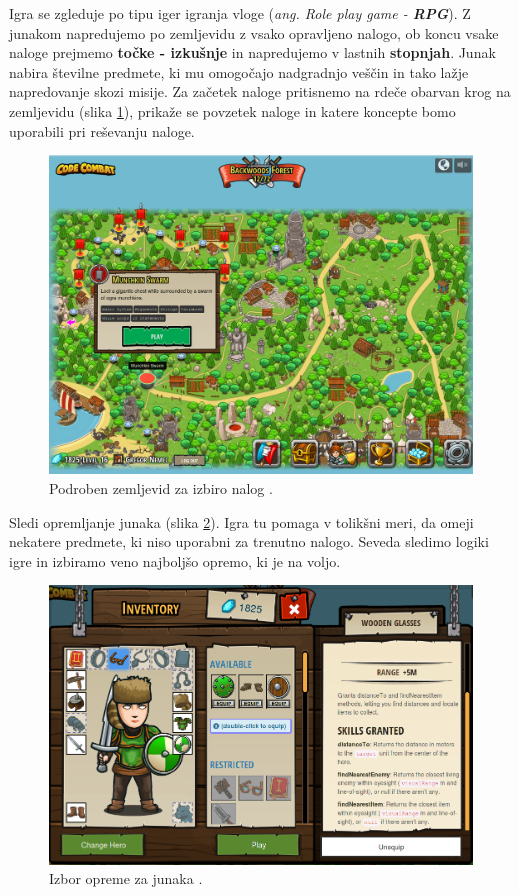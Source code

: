  Igra se zgleduje po tipu iger igranja vloge (\emph{ang. Role play
   game - \textbf{RPG}}). Z junakom napredujemo po zemljevidu z vsako
 opravljeno nalogo, ob koncu vsake naloge prejmemo \textbf{točke -
   izkušnje} in napredujemo v lastnih \textbf{stopnjah}. Junak nabira
 številne predmete, ki mu omogočajo nadgradnjo veščin in tako lažje
 napredovanje skozi misije. Za začetek naloge pritisnemo na rdeče
 obarvan krog na zemljevidu (slika \ref{fig:web:cc:zemljevid:BG}),
 prikaže se povzetek naloge in katere koncepte bomo uporabili pri
 reševanju naloge. 

\begin{figure}[h!]
  \centering
    \includegraphics [width=0.65\linewidth, keepaspectratio =
   1] {./images/sc_web/cc_izbor-zem-BG-v01.png}
   \caption{Podroben zemljevid za izbiro nalog \cite{web:codecombat}.}
   \label{fig:web:cc:zemljevid:BG}
 \end{figure}

 Sledi opremljanje junaka (slika \ref{fig:web:cc:zemljevid:EQ}). Igra
 tu pomaga v tolikšni meri, da omeji nekatere predmete, ki niso
 uporabni za trenutno nalogo. Seveda sledimo logiki igre in izbiramo
 veno najboljšo opremo, ki je na voljo.
 
\begin{figure}[h!]
  \centering
    \includegraphics [width=0.55\linewidth, keepaspectratio =
   1] {./images/sc_web/cc_izbor-zem-EQ-v01.png}
   \caption{Izbor opreme za junaka \cite{web:codecombat}.}
   \label{fig:web:cc:zemljevid:EQ}
 \end{figure}
 
